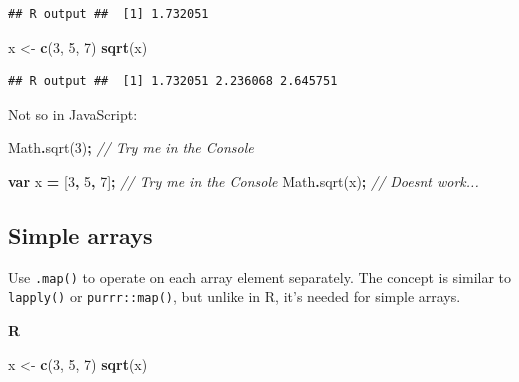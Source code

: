 \documentclass[
  openany]{book}
\newenvironment{Shaded}{\begin{snugshade}}{\end{snugshade}}
\newcommand{\BuiltInTok}[1]{#1}
\newcommand{\CommentTok}[1]{\textcolor[rgb]{0.56,0.35,0.01}{\textit{#1}}}
\newcommand{\DecValTok}[1]{\textcolor[rgb]{0.00,0.00,0.81}{#1}}
\newcommand{\FunctionTok}[1]{\textcolor[rgb]{0.00,0.00,0.00}{#1}}
\newcommand{\KeywordTok}[1]{\textcolor[rgb]{0.13,0.29,0.53}{\textbf{#1}}}
\newcommand{\NormalTok}[1]{#1}
\newcommand{\OperatorTok}[1]{\textcolor[rgb]{0.81,0.36,0.00}{\textbf{#1}}}
\newcommand{\StringTok}[1]{\textcolor[rgb]{0.31,0.60,0.02}{#1}}
\begin{document}
\begin{verbatim}
## R output ##  [1] 1.732051
\end{verbatim}

\begin{Shaded}
\begin{Highlighting}[]
\NormalTok{x \textless{}{-}}\StringTok{ }\KeywordTok{c}\NormalTok{(}\DecValTok{3}\NormalTok{, }\DecValTok{5}\NormalTok{, }\DecValTok{7}\NormalTok{)}
\KeywordTok{sqrt}\NormalTok{(x)}
\end{Highlighting}
\end{Shaded}

\begin{verbatim}
## R output ##  [1] 1.732051 2.236068 2.645751
\end{verbatim}

Not so in JavaScript:

\begin{Shaded}
\begin{Highlighting}[]
\BuiltInTok{Math}\OperatorTok{.}\FunctionTok{sqrt}\NormalTok{(}\DecValTok{3}\NormalTok{)}\OperatorTok{;}     \CommentTok{// Try me in the Console}
\end{Highlighting}
\end{Shaded}

\begin{Shaded}
\begin{Highlighting}[]
\KeywordTok{var}\NormalTok{ x }\OperatorTok{=}\NormalTok{ [}\DecValTok{3}\OperatorTok{,} \DecValTok{5}\OperatorTok{,} \DecValTok{7}\NormalTok{]}\OperatorTok{;}     \CommentTok{// Try me in the Console}
\BuiltInTok{Math}\OperatorTok{.}\FunctionTok{sqrt}\NormalTok{(x)}\OperatorTok{;}          \CommentTok{// Doesn\textquotesingle{}t work...}
\end{Highlighting}
\end{Shaded}

\hypertarget{simple-arrays}{%
\subsection{Simple arrays}\label{simple-arrays}}

Use \texttt{.map()} to operate on each array element separately. The concept is similar to \texttt{lapply()} or \texttt{purrr::map()}, but unlike in R, it's needed for simple arrays.

\textbf{R}

\begin{Shaded}
\begin{Highlighting}[]
\NormalTok{x \textless{}{-}}\StringTok{ }\KeywordTok{c}\NormalTok{(}\DecValTok{3}\NormalTok{, }\DecValTok{5}\NormalTok{, }\DecValTok{7}\NormalTok{)}
\KeywordTok{sqrt}\NormalTok{(x)}
\end{Highlighting}
\end{Shaded}
\end{document}
